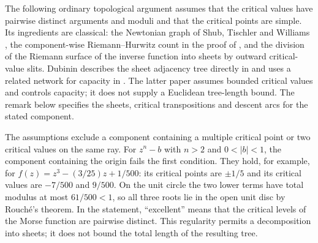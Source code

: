 The following ordinary topological argument assumes that the critical
values have pairwise distinct arguments and moduli and that the critical
points are simple. Its ingredients are classical: the Newtonian graph of Shub, Tischler and Williams
\cite[\S2]{kozen-stefansson1997}, the component-wise Riemann--Hurwitz count in
the proof of \cite[Proposition~2.1]{eks2010}, and the division of the Riemann
surface of the inverse function into sheets by outward critical-value
slits.  Dubinin describes the sheet adjacency tree directly in
\cite[\S1, pp.~1169--1170]{dubinin2006critical} and uses a related
network for capacity in \cite[\S2, pp.~34--35]{dubinin2006capacity}.
The latter paper assumes bounded critical values and controls capacity;
it does not supply a Euclidean tree-length bound. The remark below
specifies the sheets, critical transpositions and descent arcs for the
stated component.

The assumptions exclude a component containing a multiple critical point
or two critical values on the same ray. For $z^n-b$ with $n>2$ and
$0<|b|<1$, the component containing the origin fails the first condition.
They hold, for example, for
$f(z)=z^3-(3/25)z+1/500$: its critical points are $\pm1/5$ and its
critical values are $-7/500$ and $9/500$. On the unit circle the two
lower terms have total modulus at most $61/500<1$, so all three roots
lie in the open unit disc by Rouch\'e's theorem. In the statement,
``excellent'' means that the critical levels of the Morse function are
pairwise distinct. This regularity permits a decomposition into sheets;
it does not bound the total length of the resulting tree.

